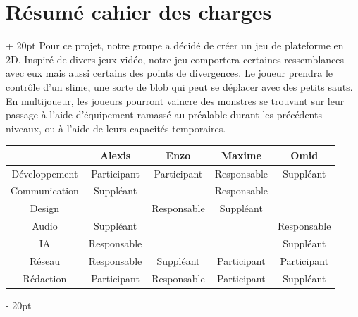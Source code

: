 \documentclass[a4paper, 12pt, twoside]{article}
\newcommand{\ind}[1][20pt]{\advance\leftskip + #1}
\newcommand{\deind}[1][20pt]{\advance\leftskip - #1}
\newenvironment{indt}[2][20pt]{#2 \par \ind[#1]}{\par \deind} %
\begin{document}
    \begin{indt}{\section{Résumé cahier des charges}}
        Pour ce projet, notre groupe a décidé de créer un jeu de plateforme en 2D. Inspiré de divers jeux vidéo, notre jeu comportera certaines ressemblances avec eux mais aussi certains des points de divergences. Le joueur prendra le contrôle d'un slime, une sorte de blob qui peut se déplacer avec des petits sauts. En multijoueur, les joueurs pourront vaincre des monstres se trouvant sur leur passage à l'aide d'équipement ramassé au préalable durant les précédents niveaux, ou à l'aide de leurs capacités temporaires.
    
        \begin{center}
            \begin{tabular}{|c|c|c|c|c|}
                \hline
                & Alexis & Enzo & Maxime & Omid
                \\
                \hline
                Développement & Participant & Participant & Responsable & Suppléant
                \\
                \hline
                Communication & Suppléant & & Responsable &
                \\
                \hline
                Design & & Responsable & Suppléant &
                \\
                \hline
                Audio & Suppléant & & & Responsable
                \\
                \hline
                IA & Responsable & & & Suppléant
                \\
                \hline
                Réseau & Responsable & Suppléant & Participant & Participant
                \\
                \hline
                Rédaction & Participant & Responsable & Participant & Suppléant
                \\
                \hline
            \end{tabular}
        \end{center}
    \end{indt}

    \newpage
    
\end{document}

